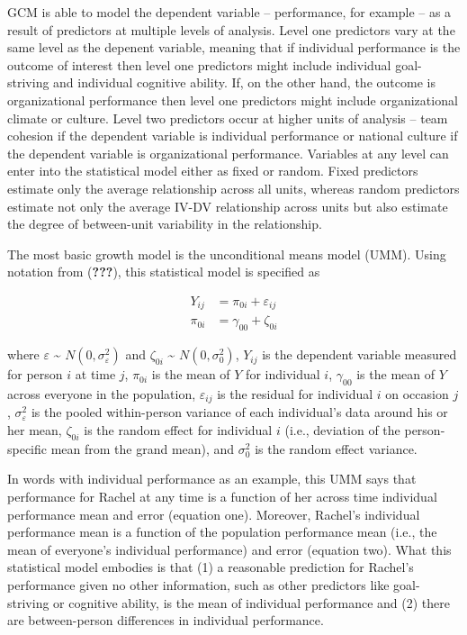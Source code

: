 \documentclass[english,,man]{apa6}
\begin{document}
GCM is able to model the dependent variable -- performance, for example -- as a result of predictors at multiple levels of analysis. Level one predictors vary at the same level as the depenent variable, meaning that if individual performance is the outcome of interest then level one predictors might include individual goal-striving and individual cognitive ability. If, on the other hand, the outcome is organizational performance then level one predictors might include organizational climate or culture. Level two predictors occur at higher units of analysis -- team cohesion if the dependent variable is individual performance or national culture if the dependent variable is organizational performance. Variables at any level can enter into the statistical model either as fixed or random. Fixed predictors estimate only the average relationship across all units, whereas random predictors estimate not only the average IV-DV relationship across units but also estimate the degree of between-unit variability in the relationship.

The most basic growth model is the unconditional means model (UMM). Using notation from ({\textbf{???}}), this statistical model is specified as

\begin{align}
\label{UMM}
Y_{ij} &= \pi_{0i} + \varepsilon_{ij} \\
\pi_{0i} &= \gamma_{00} + \zeta_{0i}
\end{align}

\noindent where \(\varepsilon\) \textasciitilde{} \(N(0, \sigma_{\varepsilon}^2)\) and \(\zeta_{0i}\) \textasciitilde{} \(N(0, \sigma_{0}^2)\), \(Y_{ij}\) is the dependent variable measured for person \(i\) at time \(j\), \(\pi_{0i}\) is the mean of \(Y\) for individual \(i\), \(\gamma_{00}\) is the mean of \(Y\) across everyone in the population, \(\varepsilon_{ij}\) is the residual for individual \(i\) on occasion \(j\), \(\sigma_{\varepsilon}^2\) is the pooled within-person variance of each individual's data around his or her mean, \(\zeta_{0i}\) is the random effect for individual \(i\) (i.e., deviation of the person-specific mean from the grand mean), and \(\sigma_0^2\) is the random effect variance.

In words with individual performance as an example, this UMM says that performance for Rachel at any time is a function of her across time individual performance mean and error (equation one). Moreover, Rachel's individual performance mean is a function of the population performance mean (i.e., the mean of everyone's individual performance) and error (equation two). What this statistical model embodies is that (1) a reasonable prediction for Rachel's performance given no other information, such as other predictors like goal-striving or cognitive ability, is the mean of individual performance and (2) there are between-person differences in individual performance.
\end{document}
